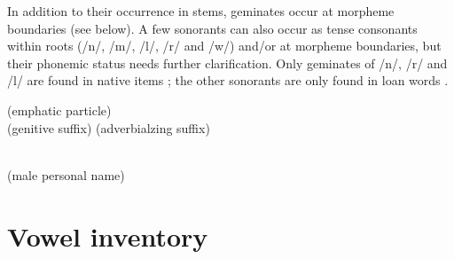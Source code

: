 In addition to their occurrence in stems, geminates occur at morpheme boundaries (see  below). A few sonorants can also occur as tense consonants within roots (/n/, /m/, /l/, /r/ and /w/) and/or at morpheme boundaries, but their phonemic status needs further clarification. Only geminates of /n/, /r/ and /l/ are found in native items ; the other sonorants are only found in loan words .
%
\begin{exe}
	\ex	\label{ex:gemination C1 phon}
	\TabPositions{11em}
		 	 \tab {} (emphatic particle)	\\
		 (genitive suffix)	\tab {} (adverbialzing suffix)	\\
		 	

	\ex	\label{ex:gemination C2 phon}
	\TabPositions{11em}
			 	 \tab 	{} 	\\
			 	 \tab 	{} (male personal name)		
\end{exe}



\section{Vowel inventory}
\label{sec:Vowel inventory}

